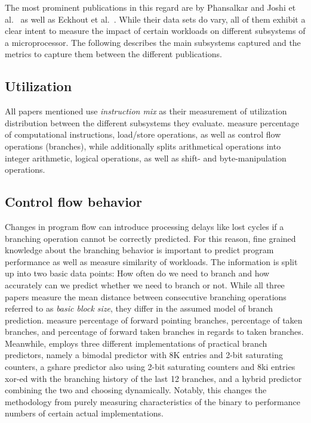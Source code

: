 \documentclass[../bachelor_paper.tex]{subfiles}
\begin{document}
The most prominent publications in this regard are by Phansalkar and Joshi et al.\ \cite{phansalkarMeasuringProgramSimilarity2005,joshiMeasuringBenchmarkSimilarity2006} as well as Eckhout et al.\ \cite{eeckhoutQuantifyingImpactInput}. While their data sets do vary, all of them exhibit a clear intent to measure the impact of certain workloads on different subsystems of a microprocessor. The following describes the main subsystems captured and the metrics to capture them between the different publications.

\subsection{Utilization}
All papers mentioned use \emph{instruction mix} as their measurement of utilization distribution between the different subsystems they evaluate. \cite{phansalkarMeasuringProgramSimilarity2005,joshiMeasuringBenchmarkSimilarity2006} measure percentage of computational instructions, load/store operations, as well as control flow operations (branches), while \cite{eeckhoutQuantifyingImpactInput} additionally splits arithmetical operations into integer arithmetic, logical operations, as well as shift- and byte-manipulation operations.

\subsection{Control flow behavior}
Changes in program flow can introduce processing delays like lost cycles if a branching operation cannot be correctly predicted. For this reason, fine grained knowledge about the branching behavior is important to predict program performance as well as measure similarity of workloads. The information is split up into two basic data points: How often do we need to branch and how accurately can we predict whether we need to branch or not. While all three papers measure the mean distance between consecutive branching operations referred to as \emph{basic block size}, they differ in the assumed model of branch prediction. \cite{phansalkarMeasuringProgramSimilarity2005,joshiMeasuringBenchmarkSimilarity2006} measure percentage of forward pointing branches, percentage of taken branches, and percentage of forward taken branches in regards to taken branches. Meanwhile, \cite{eeckhoutQuantifyingImpactInput} employs three different implementations of practical branch predictors, namely a bimodal predictor with 8K entries and 2-bit saturating counters, a gshare predictor also using 2-bit saturating counters and 8ki entries xor-ed with the branching history of the last 12 branches, and a hybrid predictor combining the two and choosing dynamically. Notably, this changes the methodology from purely measuring characteristics of the binary to performance numbers of certain actual implementations.
\end{document}
